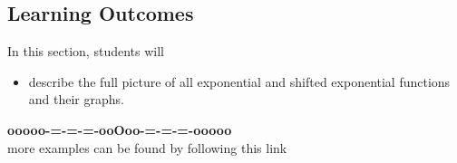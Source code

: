 \documentclass{ximera}
\begin{document}
\subsection*{Learning Outcomes}


\begin{sectionOutcomes}
In this section, students will 

\begin{itemize}
\item describe the full picture of all exponential and shifted exponential functions and their graphs.
\end{itemize}
\end{sectionOutcomes}












\begin{center}
\textbf{\textcolor{green!50!black}{ooooo-=-=-=-ooOoo-=-=-=-ooooo}} \\

more examples can be found by following this link\\ 

\end{center}
\end{document}

